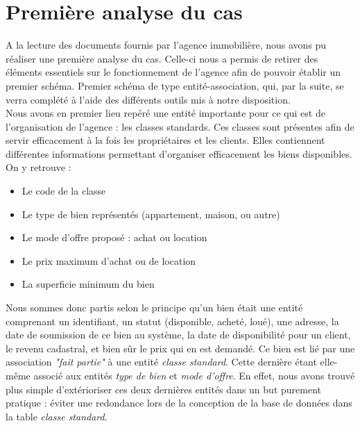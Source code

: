 \section{Première analyse du cas}
A la lecture des documents fournis par l'agence immobilière, nous avons pu réaliser une première analyse du cas. Celle-ci nous a permis de retirer des éléments essentiels sur le fonctionnement de l'agence afin de pouvoir établir un premier schéma. Premier schéma de type entité-association, qui, par la suite, se verra complété à l'aide des différents outils mis à notre disposition.\\

Nous avons en premier lieu repéré une entité importante pour ce qui est de l'organisation de l'agence : les classes standards. Ces classes sont présentes afin de servir efficacement à la fois les propriétaires et les clients. Elles contiennent différentes informations permettant d'organiser efficacement les biens disponibles. On y retrouve : \begin{itemize}
	\item Le code de la classe
	\item Le type de bien représentés (appartement, maison, ou autre)
	\item Le mode d'offre proposé : achat ou location
	\item Le prix maximum d'achat ou de location
	\item La superficie minimum du bien
\end{itemize}
Nous sommes donc partis selon le principe qu'un bien était une entité comprenant un identifiant, un statut (disponible, acheté, loué), une adresse, la date de soumission de ce bien au système, la date de disponibilité pour un client, le revenu cadastral, et bien sûr le prix qui en est demandé. Ce bien est lié par une association \textit{"fait partie"} à une entité \textit{classe standard}. Cette dernière étant elle-même associé aux entités \textit{type de bien} et \textit{mode d'offre}. En effet, nous avons trouvé plus simple d'extérioriser ces deux dernières entités dans un but purement pratique : éviter une redondance lors de la conception de la base de données dans la table \textit{classe standard}.\\

